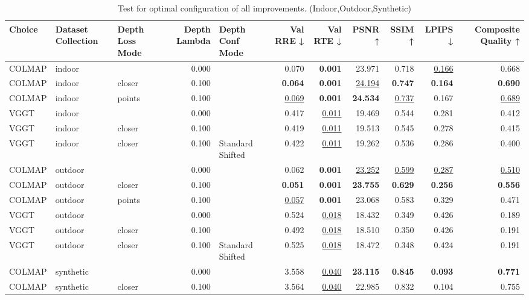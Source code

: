 \begin{table}[H]
\caption{Test for optimal configuration of all improvements. (Indoor,Outdoor,Synthetic)}
\label{tab:99_all_improvements_indoor,outdoor,synthetic}
\centering
\scriptsize
\begin{tabular}{lllrlrrrrrr}
\toprule
Choice & Dataset Collection & Depth Loss Mode & Depth Lambda & Depth Conf Mode & Val RRE ↓ & Val RTE ↓ & PSNR ↑ & SSIM ↑ & LPIPS ↓ & Composite Quality ↑ \\
\midrule
COLMAP & indoor &  & 0.000 &  & 0.070 & \textbf{0.001} & 23.971 & 0.718 & \underline{0.166} & 0.668 \\
COLMAP & indoor & closer & 0.100 &  & \textbf{0.064} & \textbf{0.001} & \underline{24.194} & \textbf{0.747} & \textbf{0.164} & \textbf{0.690} \\
COLMAP & indoor & points & 0.100 &  & \underline{0.069} & \textbf{0.001} & \textbf{24.534} & \underline{0.737} & 0.167 & \underline{0.689} \\
VGGT & indoor &  & 0.000 &  & 0.417 & \underline{0.011} & 19.469 & 0.544 & 0.281 & 0.412 \\
VGGT & indoor & closer & 0.100 &  & 0.419 & \underline{0.011} & 19.513 & 0.545 & 0.278 & 0.415 \\
VGGT & indoor & closer & 0.100 & Standard Shifted & 0.422 & \underline{0.011} & 19.262 & 0.536 & 0.286 & 0.400 \\
\midrule
COLMAP & outdoor &  & 0.000 &  & 0.062 & \textbf{0.001} & \underline{23.252} & \underline{0.599} & \underline{0.287} & \underline{0.510} \\
COLMAP & outdoor & closer & 0.100 &  & \textbf{0.051} & \textbf{0.001} & \textbf{23.755} & \textbf{0.629} & \textbf{0.256} & \textbf{0.556} \\
COLMAP & outdoor & points & 0.100 &  & \underline{0.057} & \textbf{0.001} & 23.068 & 0.583 & 0.329 & 0.471 \\
VGGT & outdoor &  & 0.000 &  & 0.524 & \underline{0.018} & 18.432 & 0.349 & 0.426 & 0.189 \\
VGGT & outdoor & closer & 0.100 &  & 0.492 & \underline{0.018} & 18.510 & 0.350 & 0.426 & 0.191 \\
VGGT & outdoor & closer & 0.100 & Standard Shifted & 0.525 & \underline{0.018} & 18.472 & 0.348 & 0.424 & 0.191 \\
\midrule
COLMAP & synthetic &  & 0.000 &  & 3.558 & \underline{0.040} & \textbf{23.115} & \textbf{0.845} & \textbf{0.093} & \textbf{0.771} \\
COLMAP & synthetic & closer & 0.100 &  & 3.564 & \underline{0.040} & 22.985 & 0.832 & 0.104 & 0.755 \\

\end{tabular}
\end{table}
